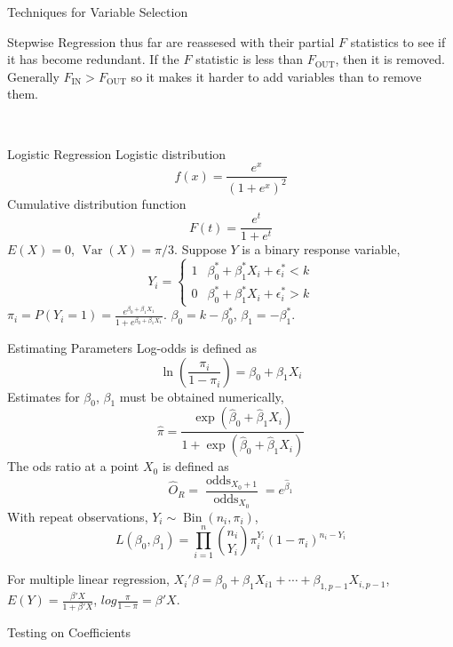 \documentclass{article}
\DeclareMathOperator{\Var}{Var}
\DeclareMathOperator{\Bin}{Bin}
\DeclareMathOperator{\fin}{IN}
\DeclareMathOperator{\fout}{OUT}
\DeclareMathOperator{\odds}{odds}
\begin{document}
\begin{multicols*}{3}
\begin{blackbox}{Techniques for Variable Selection}
\begin{pinkbox}{Stepwise Regression}
                thus far are reassesed with their partial $F$ statistics to see if it has become redundant. If the $F$ statistic is less than $F_{\fout}$, then it is removed. Generally $F_{\fin} > F_{\fout}$ so it makes it harder to add variables than to remove them.
            \end{pinkbox}\\[-2ex]
        \end{blackbox}
        \begin{blackbox}{Logistic Regression}
            Logistic distribution\\[-3ex]
            \[f(x) = \frac{e^x}{(1+e^{x})^2}\]            
            Cumulative distribution function\\[-2ex]
            \[F(t) = \frac{e^t}{1+e^t}\]
            $E(X) = 0$, $\Var(X) = \pi/3$. Suppose $Y$ is a binary response variable,\\[-2ex]
            \[Y_i = \begin{cases}
                1 & \beta^*_0 + \beta^*_1X_i + \epsilon^*_i < k\\
                0 & \beta^*_0 + \beta^*_1X_i + \epsilon^*_i > k
            \end{cases}\]
            $\pi_i = P(Y_i = 1) = \frac{e^{\beta_0 + \beta_1X_1}}{1 + e^{\beta_0 + \beta_1X_1}}$. $\beta_0 = k - \beta_0^*$, $\beta_1 = -\beta_1^*$.
            \begin{bluebox}{Estimating Parameters}
                Log-odds is defined as \\[-2ex]
                \[\ln\left(\frac{\pi_i}{1-\pi_i}\right) = \beta_0 + \beta_1 X_i\]
                Estimates for $\beta_0$, $\beta_1$ must be obtained numerically, \\[-2ex]
                \[\hat{\pi} = \frac{\exp(\hat{\beta}_0 + \hat{\beta}_1X_i)}{1 + \exp(\hat{\beta}_0 + \hat{\beta}_1X_i)}\]
                The ods ratio at a point $X_0$ is defined as \\[-2ex]
                \[\hat{O}_R = \frac{\odds_{X_0+1}}{\odds_{X_0}} = e^{\hat{\beta}_1}\]
                With repeat observations, $Y_i \sim \Bin(n_i,\pi_i)$,\\[-2ex] 
                \[L(\beta_0, \beta_1) = \prod_{i=1}^n {n_i \choose Y_i} \pi_i^{Y_i}(1-\pi_i)^{n_i - Y_i}\]
            \end{bluebox}
            For multiple linear regression, $X_i'\beta = \beta_0 + \beta_1X_{i1} + \cdots + \beta_{1,p-1}X_{i,p-1}$, $E(Y) = \frac{\beta'X}{1 + \beta'X}$, $log\frac{\pi}{1-\pi} = \beta'X$.
            \begin{brownbox}{Testing on Coefficients}

\end{brownbox}
\end{blackbox}
\end{multicols*}
\end{document}

